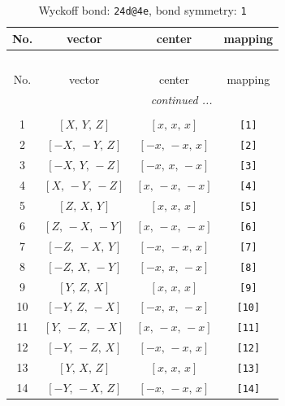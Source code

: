 \documentclass[fleqn,8pt]{jsarticle}
\begin{document}
\begin{longtable}{cccc}
\caption{Wyckoff bond: {\tt 24d@4e}, bond symmetry: {\tt 1}}
 \\
 \hline \hline
No. & vector & center & mapping \\ \hline \endfirsthead

\multicolumn{3}{l}{\tablename\ \thetable{}} \\
 \hline \hline
No. & vector & center & mapping \\ \hline \endhead

 \hline \hline
\multicolumn{3}{r}{\footnotesize\it continued ...} \\ \endfoot

 \hline \hline
\multicolumn{3}{r}{} \\ \endlastfoot

1 & $\left[ X,\, Y,\, Z \right]$ & $\left[ x,\, x,\, x \right]$ & {\tt [1]} \\ \hline
2 & $\left[ - X,\, - Y,\, Z \right]$ & $\left[ - x,\, - x,\, x \right]$ & {\tt [2]} \\ \hline
3 & $\left[ - X,\, Y,\, - Z \right]$ & $\left[ - x,\, x,\, - x \right]$ & {\tt [3]} \\ \hline
4 & $\left[ X,\, - Y,\, - Z \right]$ & $\left[ x,\, - x,\, - x \right]$ & {\tt [4]} \\ \hline
5 & $\left[ Z,\, X,\, Y \right]$ & $\left[ x,\, x,\, x \right]$ & {\tt [5]} \\ \hline
6 & $\left[ Z,\, - X,\, - Y \right]$ & $\left[ x,\, - x,\, - x \right]$ & {\tt [6]} \\ \hline
7 & $\left[ - Z,\, - X,\, Y \right]$ & $\left[ - x,\, - x,\, x \right]$ & {\tt [7]} \\ \hline
8 & $\left[ - Z,\, X,\, - Y \right]$ & $\left[ - x,\, x,\, - x \right]$ & {\tt [8]} \\ \hline
9 & $\left[ Y,\, Z,\, X \right]$ & $\left[ x,\, x,\, x \right]$ & {\tt [9]} \\ \hline
10 & $\left[ - Y,\, Z,\, - X \right]$ & $\left[ - x,\, x,\, - x \right]$ & {\tt [10]} \\ \hline
11 & $\left[ Y,\, - Z,\, - X \right]$ & $\left[ x,\, - x,\, - x \right]$ & {\tt [11]} \\ \hline
12 & $\left[ - Y,\, - Z,\, X \right]$ & $\left[ - x,\, - x,\, x \right]$ & {\tt [12]} \\ \hline
13 & $\left[ Y,\, X,\, Z \right]$ & $\left[ x,\, x,\, x \right]$ & {\tt [13]} \\ \hline
14 & $\left[ - Y,\, - X,\, Z \right]$ & $\left[ - x,\, - x,\, x \right]$ & {\tt [14]} \\ \hline

\end{longtable}
\end{document}
